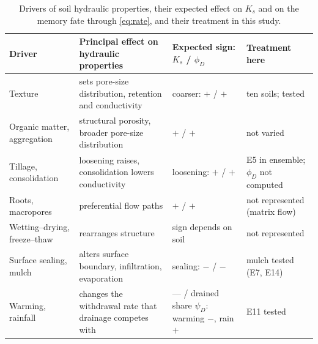 \begin{table}[H]\centering\small
\caption{Drivers of soil hydraulic properties, their expected effect on $K_s$ and on the memory fate through \cref{eq:rate}, and their treatment in this study.}
\label{tab:drivers}
\begin{tabularx}{\textwidth}{>{\raggedright\arraybackslash}p{2.6cm}>{\raggedright\arraybackslash}X>{\raggedright\arraybackslash}p{2.3cm}>{\raggedright\arraybackslash}p{3.0cm}}
\toprule
Driver & Principal effect on hydraulic properties & Expected sign: $K_s$ / $\phi_D$ & Treatment here\\\midrule
Texture & sets pore-size distribution, retention and conductivity & coarser: $+$ / $+$ & ten soils; tested\\
Organic matter, aggregation & structural porosity, broader pore-size distribution & $+$ / $+$ & not varied\\
Tillage, consolidation & loosening raises, consolidation lowers conductivity & loosening: $+$ / $+$ & E5 in ensemble; $\phi_D$ not computed\\
Roots, macropores & preferential flow paths & $+$ / $+$ & not represented (matrix flow)\\
Wetting--drying, freeze--thaw & rearranges structure & sign depends on soil & not represented\\
Surface sealing, mulch & alters surface boundary, infiltration, evaporation & sealing: $-$ / $-$ & mulch tested (E7, E14)\\
Warming, rainfall & changes the withdrawal rate that drainage competes with & --- / drained share $\psi_D$: warming $-$, rain $+$ & E11 tested\\\bottomrule
\end{tabularx}
\end{table}

